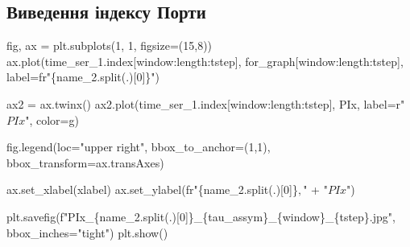 \documentclass[
  letterpaper,
]{report}
\newenvironment{Shaded}{\begin{snugshade}}{\end{snugshade}}
\newcommand{\DecValTok}[1]{\textcolor[rgb]{0.68,0.00,0.00}{#1}}
\newcommand{\NormalTok}[1]{\textcolor[rgb]{0.00,0.23,0.31}{#1}}
\newcommand{\OperatorTok}[1]{\textcolor[rgb]{0.37,0.37,0.37}{#1}}
\newcommand{\SpecialCharTok}[1]{\textcolor[rgb]{0.37,0.37,0.37}{#1}}
\newcommand{\SpecialStringTok}[1]{\textcolor[rgb]{0.13,0.47,0.30}{#1}}
\newcommand{\StringTok}[1]{\textcolor[rgb]{0.13,0.47,0.30}{#1}}
\newcommand{\VerbatimStringTok}[1]{\textcolor[rgb]{0.13,0.47,0.30}{#1}}
\begin{document}
\hypertarget{ux432ux438ux432ux435ux434ux435ux43dux43dux44f-ux456ux43dux434ux435ux43aux441ux443-ux43fux43eux440ux442ux438}{%
\subsection{Виведення індексу
Порти}\label{ux432ux438ux432ux435ux434ux435ux43dux43dux44f-ux456ux43dux434ux435ux43aux441ux443-ux43fux43eux440ux442ux438}}

\begin{Shaded}
\begin{Highlighting}[]
\NormalTok{fig, ax }\OperatorTok{=}\NormalTok{ plt.subplots(}\DecValTok{1}\NormalTok{, }\DecValTok{1}\NormalTok{, figsize}\OperatorTok{=}\NormalTok{(}\DecValTok{15}\NormalTok{,}\DecValTok{8}\NormalTok{))}
\NormalTok{ax.plot(time\_ser\_1.index[window:length:tstep], for\_graph[window:length:tstep], label}\OperatorTok{=}\VerbatimStringTok{fr"}\SpecialCharTok{\{}\NormalTok{name\_2}\SpecialCharTok{.}\NormalTok{split(}\StringTok{\textquotesingle{}.\textquotesingle{}}\NormalTok{)[}\DecValTok{0}\NormalTok{]}\SpecialCharTok{\}}\VerbatimStringTok{"}\NormalTok{)}

\NormalTok{ax2 }\OperatorTok{=}\NormalTok{ ax.twinx()}
\NormalTok{ax2.plot(time\_ser\_1.index[window:length:tstep], PIx, label}\OperatorTok{=}\VerbatimStringTok{r"$ PIx $"}\NormalTok{, color}\OperatorTok{=}\StringTok{\textquotesingle{}g\textquotesingle{}}\NormalTok{)}

\NormalTok{fig.legend(loc}\OperatorTok{=}\StringTok{"upper right"}\NormalTok{, bbox\_to\_anchor}\OperatorTok{=}\NormalTok{(}\DecValTok{1}\NormalTok{,}\DecValTok{1}\NormalTok{), bbox\_transform}\OperatorTok{=}\NormalTok{ax.transAxes)}

\NormalTok{ax.set\_xlabel(xlabel)}
\NormalTok{ax.set\_ylabel(}\VerbatimStringTok{fr"}\SpecialCharTok{\{}\NormalTok{name\_2}\SpecialCharTok{.}\NormalTok{split(}\StringTok{\textquotesingle{}.\textquotesingle{}}\NormalTok{)[}\DecValTok{0}\NormalTok{]}\SpecialCharTok{\}}\VerbatimStringTok{$,$"} \OperatorTok{+} \StringTok{"$PIx$"}\NormalTok{)}

\NormalTok{plt.savefig(}\SpecialStringTok{f"PIx\_}\SpecialCharTok{\{}\NormalTok{name\_2}\SpecialCharTok{.}\NormalTok{split(}\StringTok{\textquotesingle{}.\textquotesingle{}}\NormalTok{)[}\DecValTok{0}\NormalTok{]}\SpecialCharTok{\}}\SpecialStringTok{\_}\SpecialCharTok{\{}\NormalTok{tau\_assym}\SpecialCharTok{\}}\SpecialStringTok{\_}\SpecialCharTok{\{}\NormalTok{window}\SpecialCharTok{\}}\SpecialStringTok{\_}\SpecialCharTok{\{}\NormalTok{tstep}\SpecialCharTok{\}}\SpecialStringTok{.jpg"}\NormalTok{, bbox\_inches}\OperatorTok{=}\StringTok{"tight"}\NormalTok{)}
\NormalTok{plt.show()}
\end{Highlighting}
\end{Shaded}
\end{document}
